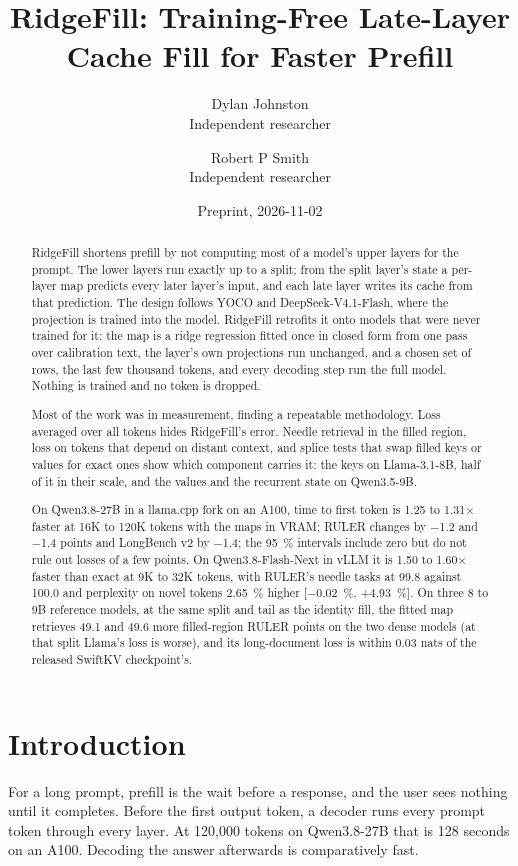 \documentclass[11pt]{article}
\title{RidgeFill: Training-Free Late-Layer Cache Fill for Faster Prefill}
\author{Dylan Johnston\\\normalsize Independent researcher \and Robert P Smith\\\normalsize Independent researcher}
\date{Preprint, 2026-11-02}
\begin{document}
\maketitle
\begin{abstract}
RidgeFill shortens prefill by not computing most of a model's upper layers for the prompt. The lower layers run exactly up to a split; from the split layer's state a per-layer map predicts every later layer's input, and each late layer writes its cache from that prediction. The design follows YOCO and DeepSeek-V4.1-Flash, where the projection is trained into the model. RidgeFill retrofits it onto models that were never trained for it: the map is a ridge regression fitted once in closed form from one pass over calibration text, the layer's own projections run unchanged, and a chosen set of rows, the last few thousand tokens, and every decoding step run the full model. Nothing is trained and no token is dropped.

Most of the work was in measurement, finding a repeatable methodology. Loss averaged over all tokens hides RidgeFill's error. Needle retrieval in the filled region, loss on tokens that depend on distant context, and splice tests that swap filled keys or values for exact ones show which component carries it: the keys on Llama-3.1-8B, half of it in their scale, and the values and the recurrent state on Qwen3.5-9B.

On Qwen3.8-27B in a llama.cpp fork on an A100, time to first token is 1.25 to 1.31$\times$ faster at 16K to 120K tokens with the maps in VRAM; RULER changes by $-$1.2 and $-$1.4 points and LongBench v2 by $-$1.4; the 95~\% intervals include zero but do not rule out losses of a few points. On Qwen3.8-Flash-Next in vLLM it is 1.50 to 1.60$\times$ faster than exact at 9K to 32K tokens, with RULER's needle tasks at 99.8 against 100.0 and perplexity on novel tokens 2.65~\% higher [$-$0.02~\%, +4.93~\%]. On three 8 to 9B reference models, at the same split and tail as the identity fill, the fitted map retrieves 49.1 and 49.6 more filled-region RULER points on the two dense models (at that split Llama's loss is worse), and its long-document loss is within 0.03 nats of the released SwiftKV checkpoint's.

\end{abstract}


\section{Introduction}\label{sec:1}
For a long prompt, prefill is the wait before a response, and the user sees nothing until it completes. Before the first output token, a decoder runs every prompt token through every layer. At 120,000 tokens on Qwen3.8-27B that is 128 seconds on an A100. Decoding the answer afterwards is comparatively fast.
\end{document}
